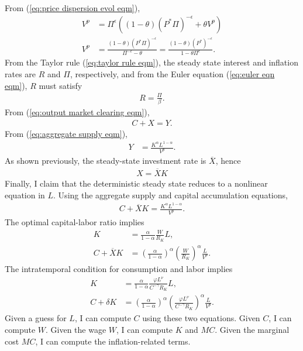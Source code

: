 \documentclass[12 pt, oneside]{article}
\theoremstyle{definition}
\theoremstyle{definition}
\theoremstyle{definition}
\begin{document}
From (\ref{eq:price dispersion evol eqm}),
\begin{align*}
  V^p & = \Pi^\epsilon\left((1 - \theta)(P^* \Pi)^{-\epsilon} + \theta V^p\right)\\
  V^p & = \frac{(1 - \theta)(P^* \Pi)^{-\epsilon}}{\Pi^{-\epsilon} - \theta} = \frac{(1- \theta)(P^*)^{-\epsilon}}{1 - \theta \Pi^{\epsilon}}.
\end{align*}
From the Taylor rule (\ref{eq:taylor rule eqm}), the steady state interest and inflation rates are $R$ and $\Pi$, respectively, and from the Euler equation (\ref{eq:euler eqn eqm}), $R$ must satisfy
\begin{align*}
  R = \frac{\Pi}{\beta}.
\end{align*}
From (\ref{eq:output market clearing eqm}),
\begin{align*}
  C + X = Y.
\end{align*}
From (\ref{eq:aggregate supply eqm}),
\begin{align*}
  Y & = \frac{K^\alpha L^{1 - \alpha}}{V^p}.
\end{align*}
As shown previously, the steady-state investment rate is $\overline{X}$, hence
\begin{align*}
  X = \overline{X}K
\end{align*}
Finally, I claim that the deterministic steady state reduces to a nonlinear equation in $L$. Using the aggregate supply and capital accumulation equations,
\begin{align*}
  C + \overline{X} K = \frac{K^\alpha L^{1 - \alpha}}{V^p}.
\end{align*}
The optimal capital-labor ratio implies
\begin{align*}
  K & = \frac{\alpha}{1 - \alpha}\frac{W}{R_K}L,\\
  C + \overline{X} K & = \left(\frac{\alpha}{1 - \alpha}\right)^{\alpha} \left(\frac{W}{R_K}\right)^\alpha\frac{L}{V^p}.
\end{align*}
The intratemporal condition for consumption and labor implies
\begin{align*}
  K & = \frac{\alpha}{1 - \alpha}\frac{\varphi L^\nu}{C^{-\gamma} R_K} L,\\
  C + \delta K & = \left(\frac{\alpha}{1 - \alpha}\right)^{\alpha} \left(\frac{\varphi L^\nu}{C^{-\gamma}R_K }\right)^\alpha\frac{L}{V^p}.
\end{align*}
Given a guess for $L$, I can compute $C$ using these two equations. Given $C$, I can compute $W$. Given the wage $W$, I can compute $K$ and $MC$. Given the marginal cost $MC$, I can compute the inflation-related terms.
\end{document}
